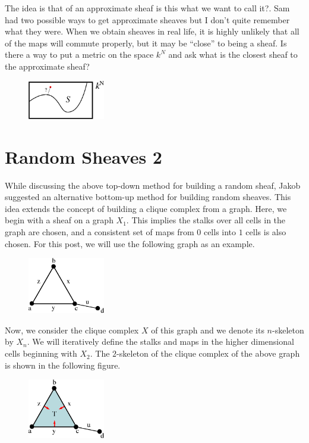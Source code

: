 \documentclass{article}
\newcommand{\clr}{\color{red}}
\theoremstyle{definition}
\begin{document}
The idea is that of an approximate sheaf {\clr is this what we want to call it?}. {\clr Sam had two possible ways to get approximate sheaves but I don't quite remember what they were.} When we obtain sheaves in real life, it is highly unlikely that all of the maps will commute properly, but it may be ``close'' to being a sheaf. Is there a way to put a metric on the space $k^N$ and ask what is the closest sheaf to the approximate sheaf?

\begin{figure}[!htbp]
\centering
	\includegraphics[width=0.3\textwidth]{images/variety3.eps}
\end{figure}


\section{Random Sheaves 2}
While discussing the above top-down method for building a random sheaf, Jakob suggested an alternative bottom-up method for building random sheaves. This idea extends the concept of building a clique complex from a graph. Here, we begin with a sheaf on a graph $X_1$. This implies the stalks over all cells in the graph are chosen, and a consistent set of maps from $0$ cells into $1$ cells is also chosen. For this post, we will use the following graph as an example.\\

\begin{figure}[!htbp]
\centering
	\includegraphics[width=0.3\textwidth]{images/graph.eps}
\end{figure}

Now, we consider the clique complex $X$ of this graph and we denote its $n$-skeleton by $X_n$. We will iteratively define the stalks and maps in the higher dimensional cells beginning with $X_2$. The $2$-skeleton of the clique complex of the above graph is shown in the following figure.

\begin{figure}[!htbp]
\centering
	\includegraphics[width=0.3\textwidth]{images/graph2.eps}
\end{figure}
\end{document}
